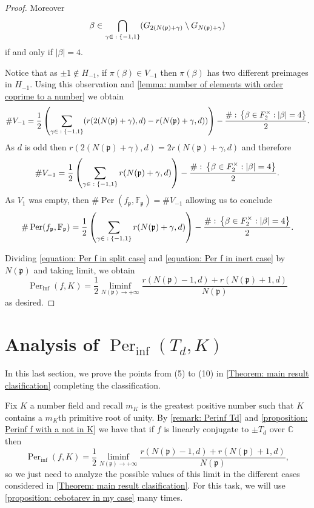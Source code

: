 \documentclass{amsart}
\def\set#1{{\def\st{\;:\;}\left\{#1\right\}}}
\def\abs#1{\left\vert{#1}\right\vert}
\def\FF{\mathbb F}
\def\CC{\mathbb C}
\DeclareMathOperator{\Per}{Per}
\DeclareMathOperator{\st}{st}
\theoremstyle{definition}
\begin{document}
\begin{proof}
Moreover $$\beta \in \bigcap_{\gamma \in \set{-1,1}} (G_{2(N(\mathfrak{p})+\gamma)} \setminus G_{N(\mathfrak{p})+\gamma})$$ if and only if $\abs{\beta} = 4$. 

Notice that as $\pm 1 \notin H_{-1}$, if $\pi(\beta) \in V_{-1}$ then $\pi(\beta)$ has two different preimages in $H_{-1}$. Using this observation and \cref{lemma: number of elements with order coprime to a number} we obtain
\begin{align*}
\# V_{-1} = \frac{1}{2} \left(\sum_{\gamma \in \set{-1,1}} (r(2(N(\mathfrak{p}) + \gamma),d) - r(N(\mathfrak{p}) + \gamma,d)) \right) - \frac{\#\set{\beta \in F_2^\times: \abs{\beta} = 4}}{2}.
\end{align*}
As $d$ is odd then $r(2(N(\mathfrak{p}) + \gamma),d) = 2 r(N(\mathfrak{p}) + \gamma,d)$ and therefore
\begin{align*}
 \# V_{-1} = \frac{1}{2} \left( \sum_{\gamma \in \set{-1,1}} r(N(\mathfrak{p}) + \gamma,d) \right) - \frac{\#\set{\beta \in F_2^\times: \abs{\beta} = 4}}{2}.
\end{align*}
As $V_1$ was empty, then $\# \Per(f_\mathfrak{p}, \FF_\mathfrak{p}) = \# V_{-1}$ allowing us to conclude
\begin{align}
\# \Per(f_\mathfrak{p}, \FF_\mathfrak{p}) = \frac{1}{2} \left( \sum_{\gamma \in \set{-1,1}} r(N(\mathfrak{p}) + \gamma,d) \right) - \frac{\#\set{\beta \in F_2^\times: \abs{\beta} = 4}}{2}.
\label{equation: Per f in inert case}
\end{align}

Dividing \cref{equation: Per f in split case} and \cref{equation: Per f in inert case} by $N(\mathfrak{p})$ and taking limit, we obtain
$$\Per_{\inf}(f,K) = \frac{1}{2} \liminf_{N(\mathfrak{p}) \rightarrow +\infty} \frac{r(N(\mathfrak{p})-1,d) + r(N(\mathfrak{p})+1,d)}{N(\mathfrak{p})}$$ as desired.
\end{proof}


\section{Analysis of $\Per_{\inf}(T_d,K)$}
\label{section: analysis of Perinf(Td)}

In this last section, we prove the points from (5) to (10) in \cref{Theorem: main result clasification} completing the classification.

Fix $K$ a number field and recall $m_K$ is the greatest positive number such that $K$ contains a $m_K$th primitive root of unity. By \cref{remark: Perinf Td} and \cref{proposition: Perinf f with a not in K} we have that if $f$ is linearly conjugate to $\pm T_d$ over $\CC$ then 
$$\Per_{\inf}(f,K) = \frac{1}{2} \liminf_{N(\mathfrak{p}) \rightarrow +\infty} \frac{r(N(\mathfrak{p})-1,d) + r(N(\mathfrak{p})+1,d)}{N(\mathfrak{p})},$$ so we just need to analyze the possible values of this limit in the different cases considered in \cref{Theorem: main result clasification}. For this task, we will use \cref{proposition: cebotarev in my case} many times.
\end{document}
